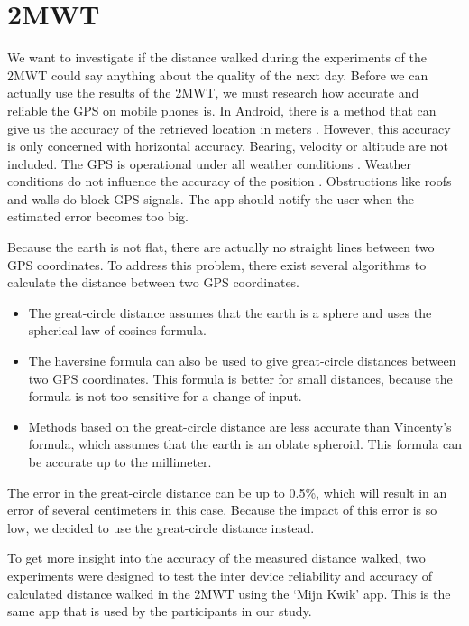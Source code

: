 
\section{2MWT} \label{section: 2MWT}
We want to investigate if the distance walked during the experiments of the 2MWT could say anything about the quality of the next day. 
Before we can actually use the results of the 2MWT, we must research how accurate and reliable the GPS on mobile phones is.
In Android, there is a method that can give us the accuracy of the retrieved location in meters \cite{androidaccuracy}.
However, this accuracy is only concerned with horizontal accuracy.
Bearing, velocity or altitude are not included.
The GPS is operational under all weather conditions\cite{bar2009geodetic} .
Weather conditions do not influence the accuracy of the position \cite{gpsweather}.
Obstructions like roofs and walls do block GPS signals.
The app should notify the user when the estimated error becomes too big.

Because the earth is not flat, there are actually no straight lines between two GPS coordinates.
To address this problem, there exist several algorithms to calculate the distance between two GPS coordinates.
%
\begin{itemize}
	\item The great-circle distance \cite{weisstein2002great} assumes that the earth is a sphere and uses the spherical law of cosines formula.
	
	\item The haversine formula can also be used to give great-circle distances between two GPS coordinates.
	This formula is better for small distances, because the formula is not too sensitive for a change of input.
	
	\item Methods based on the great-circle distance are less accurate than Vincenty's formula, which assumes that the earth is an oblate spheroid.
	This formula can be accurate up to the millimeter.
\end{itemize}
%
The error in the great-circle distance can be up to 0.5\%, which will result in an error of several centimeters in this case. 
Because the impact of this error is so low, we decided to use the great-circle distance instead.

To get more insight into the accuracy of the measured distance walked, two experiments were designed to test the inter device reliability and accuracy of calculated distance walked in the 2MWT using the `Mijn Kwik' app.
This is the same app that is used by the participants in our study.


